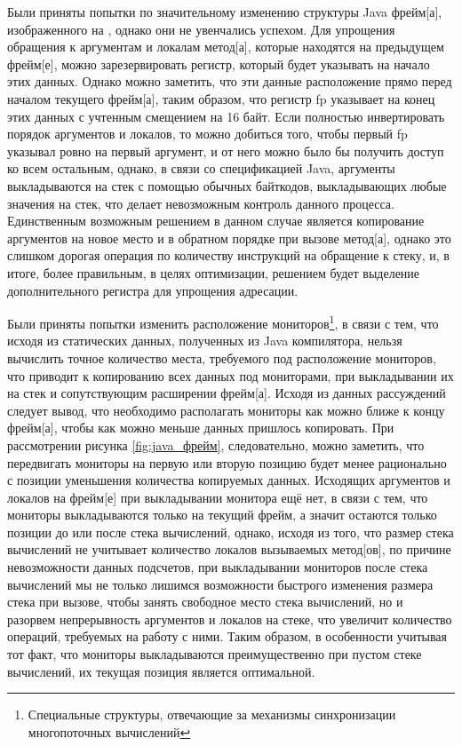 
Были приняты попытки по значительному изменению структуры Java \gls{фрейм}[а], изображенного на , однако они не увенчались успехом. Для упрощения обращения к аргументам и локалам \gls{метод}[а], которые находятся на предыдущем \gls{фрейм}[е], можно зарезервировать регистр, который будет указывать на начало этих данных. Однако можно заметить, что эти данные расположение прямо перед началом текущего \gls{фрейм}[а], таким образом, что регистр fp указывает на конец этих данных с учтенным смещением на 16 байт. Если полностью инвертировать порядок аргументов и локалов, то можно добиться того, чтобы первый fp указывал ровно на первый аргумент, и от него можно было бы получить доступ ко всем остальным, однако, в связи со спецификацией Java, аргументы выкладываются на стек с помощью обычных байткодов, выкладывающих любые значения на стек, что делает невозможным контроль данного процесса. Единственным возможным решением в данном случае является копирование аргументов на новое место и в обратном порядке при вызове \gls{метод}[а], однако это слишком дорогая операция по количеству инструкций на обращение к стеку, и, в итоге, более правильным, в целях оптимизации, решением будет выделение дополнительного регистра для упрощения адресации.

Были приняты попытки изменить расположение мониторов\footnote{Специальные структуры, отвечающие за механизмы синхронизации многопоточных вычислений}, в связи с тем, что исходя из статических данных, полученных из Java компилятора, нельзя вычислить точное количество места, требуемого под расположение мониторов, что приводит к копированию всех данных под мониторами, при выкладывании их на стек и сопутствующим расширении \gls{фрейм}[а]. Исходя из данных рассуждений следует вывод, что необходимо располагать мониторы как можно ближе к концу \gls{фрейм}[а], чтобы как можно меньше данных пришлось копировать. При рассмотрении рисунка \ref{fig:java_фрейм}, следовательно, можно заметить, что передвигать мониторы на первую или вторую позицию будет менее рационально с позиции уменьшения количества копируемых данных. Исходящих аргументов и локалов на \gls{фрейм}[е] при выкладывании монитора ещё нет, в связи с тем, что мониторы выкладываются только на текущий фрейм, а значит остаются только позиции до или после стека вычислений, однако, исходя из того, что размер стека вычислений не учитывает количество локалов вызываемых \gls{метод}[ов], по причине невозможности данных подсчетов, при выкладывании мониторов после стека вычислений мы не только лишимся возможности быстрого изменения размера стека при вызове, чтобы занять свободное место стека вычислений, но и разорвем непрерывность аргументов и локалов на стеке, что увеличит количество операций, требуемых на работу с ними. Таким образом, в особенности учитывая тот факт, что мониторы выкладываются преимущественно при пустом стеке вычислений, их текущая позиция является оптимальной.



